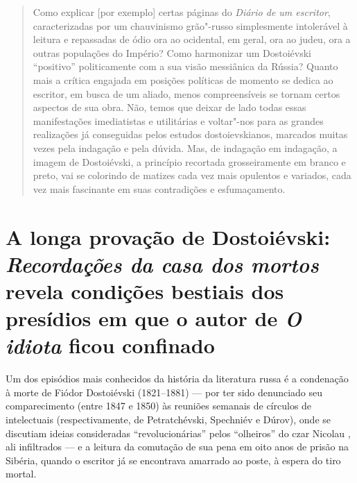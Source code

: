 \begin{quote}
Como explicar [por exemplo] certas páginas do
\emph{Diário de um escritor}, caracterizadas por um chauvinismo
grão"-russo simplesmente intolerável à leitura e repassadas de ódio ora
ao ocidental, em geral, ora ao judeu, ora a outras populações do
Império? Como harmonizar um Dostoiévski ``positivo'' politicamente com a
sua visão messiânica da Rússia? Quanto mais a crítica engajada em
posições políticas de momento se dedica ao escritor, em busca de um
aliado, menos compreensíveis se tornam certos aspectos de sua obra. Não,
temos que deixar de lado todas essas manifestações imediatistas e
utilitárias e voltar"-nos para as grandes realizações já conseguidas
pelos estudos dostoievskianos, marcados muitas vezes pela indagação e
pela dúvida. Mas, de indagação em indagação, a imagem de Dostoiévski, a
princípio recortada grosseiramente em branco e preto, vai se colorindo
de matizes cada vez mais opulentos e variados, cada vez mais fascinante
em suas contradições e esfumaçamento.
\end{quote}



\chapter*{A longa provação de Dostoiévski: \emph{Recordações da casa dos mortos} revela condições bestiais dos presídios em que o autor de \emph{O idiota} ficou confinado}



Um dos episódios mais conhecidos da história da literatura russa é a
condenação à morte de Fiódor Dostoiévski (1821--1881) --- por ter sido
denunciado seu comparecimento (entre 1847 e 1850) às reuniões semanais
de círculos de intelectuais (respectivamente, de Petratchévski,
Spechniév e Dúrov), onde se discutiam ideias consideradas
``revolucionárias'' pelos ``olheiros'' do czar Nicolau , ali
infiltrados --- e a leitura da comutação de sua pena em oito anos de
prisão na Sibéria, quando o escritor já se encontrava amarrado ao poste,
à espera do tiro mortal.

